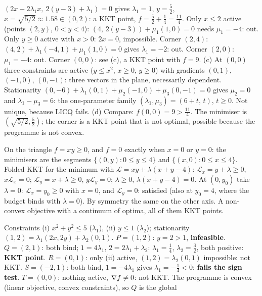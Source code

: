 \begin{solutions}
        $(2x-2\lambda_1x,\ 2(y-3)+\lambda_1)=0$ gives $\lambda_1=1$,
        $y=\tfrac52$, $x=\sqrt{5/2}\approx1.58\in(0,2)$: a KKT point, $f=\tfrac52+\tfrac14=\tfrac{11}4$.
        Only $x\le2$ active (points $(2,y)$, $0<y<4$): $(4,\,2(y-3))+\mu_1(1,0)=0$
        needs $\mu_1=-4$: out. Only $y\ge0$ active with $x>0$:
        $2x=0$, impossible. Corner $(2,4)$: $(4,2)+\lambda_1(-4,1)+\mu_1(1,0)=0$
        gives $\lambda_1=-2$: out. Corner $(2,0)$: $\mu_1=-4$: out. Corner
        $(0,0)$: see (c), a KKT point with $f=9$.
        (c) At $(0,0)$ three constraints are active ($y\le x^{2}$, $x\ge0$,
        $y\ge0$) with gradients $(0,1)$, $(-1,0)$, $(0,-1)$: three vectors
        in the plane, necessarily dependent. Stationarity
        $(0,-6)+\lambda_1(0,1)+\mu_2(-1,0)+\mu_3(0,-1)=0$ gives $\mu_2=0$
        and $\lambda_1-\mu_3=6$: the one-parameter family
        $(\lambda_1,\mu_3)=(6+t,\,t)$, $t\ge0$. Not unique, because LICQ
        fails.
        (d) Compare: $f(0,0)=9>\tfrac{11}4$. The minimiser is
        $(\sqrt{5/2},\tfrac52)$; the corner is a KKT point that is not
        optimal, possible because the programme is not convex.
  \item On the triangle $f=xy\ge0$, and $f=0$ exactly when $x=0$ or
        $y=0$: the minimisers are the segments $\{(0,y):0\le y\le4\}$ and
        $\{(x,0):0\le x\le4\}$. Folded KKT for the minimum with
        $\mathcal{L}=xy+\lambda(x+y-4)$: $\mathcal{L}_x=y+\lambda\ge0$,
        $x\mathcal{L}_x=0$; $\mathcal{L}_y=x+\lambda\ge0$, $y\mathcal{L}_y=0$;
        $\lambda\ge0$, $\lambda(x+y-4)=0$. At $(0,y_0)$ take $\lambda=0$:
        $\mathcal{L}_x=y_0\ge0$ with $x=0$, and $\mathcal{L}_y=0$:
        satisfied (also at $y_0=4$, where the budget binds with
        $\lambda=0$). By symmetry the same on the other axis. A non-convex
        objective with a continuum of optima, all of them KKT points.
  \item Constraints (i) $x^{2}+y^{2}\le5$ ($\lambda_1$), (ii) $y\le1$
        ($\lambda_2$); stationarity $(1,2)=\lambda_1(2x,2y)+\lambda_2(0,1)$.
        $P=(1,2)$: $y=2>1$, \textbf{infeasible}. $Q=(2,1)$: both bind;
        $1=4\lambda_1$, $2=2\lambda_1+\lambda_2$: $\lambda_1=\tfrac14$,
        $\lambda_2=\tfrac32$, both positive: \textbf{KKT point}.
        $R=(0,1)$: only (ii) active, $(1,2)=\lambda_2(0,1)$ impossible:
        not KKT. $S=(-2,1)$: both bind, $1=-4\lambda_1$ gives
        $\lambda_1=-\tfrac14<0$: \textbf{fails the sign test}. $T=(0,0)$:
        nothing active, $\nabla f\neq0$: not KKT. The programme is convex
        (linear objective, convex constraints), so $Q$ is the global

\end{solutions}

